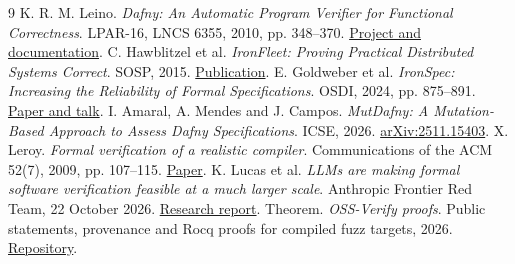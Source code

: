 \documentclass[11pt]{article}
\begin{document}
\begin{thebibliography}{9}
\small
{} K. R. M. Leino. \emph{Dafny: An Automatic Program Verifier for
Functional Correctness}. LPAR-16, LNCS 6355, 2010, pp. 348--370.
\href{https://www.microsoft.com/en-us/research/project/dafny-a-language-and-program-verifier-for-functional-correctness/}{Project and documentation}.
 C. Hawblitzel et al. \emph{IronFleet: Proving Practical
Distributed Systems Correct}. SOSP, 2015.
\href{https://www.microsoft.com/en-us/research/publication/ironfleet-proving-practical-distributed-systems-correct/}{Publication}.
 E. Goldweber et al. \emph{IronSpec: Increasing the Reliability
of Formal Specifications}. OSDI, 2024, pp. 875--891.
\href{https://www.usenix.org/conference/osdi24/presentation/goldweber}{Paper and talk}.
 I. Amaral, A. Mendes and J. Campos. \emph{MutDafny: A
Mutation-Based Approach to Assess Dafny Specifications}. ICSE, 2026.
\href{https://arxiv.org/abs/2511.15403}{arXiv:2511.15403}.
 X. Leroy. \emph{Formal verification of a realistic compiler}.
Communications of the ACM 52(7), 2009, pp. 107--115.
\href{https://xavierleroy.org/publi/compcert-CACM.pdf}{Paper}.
 K. Lucas et al. \emph{LLMs are making formal software
verification feasible at a much larger scale}. Anthropic Frontier Red Team,
22 October 2026.
\href{https://www.anthropic.com/research/formal-verification}{Research report}.
 Theorem. \emph{OSS-Verify proofs}. Public statements,
provenance and Rocq proofs for compiled fuzz targets, 2026.
\href{https://github.com/theorem-labs/oss-verify-proofs}{Repository}.
\end{thebibliography}
\end{document}
